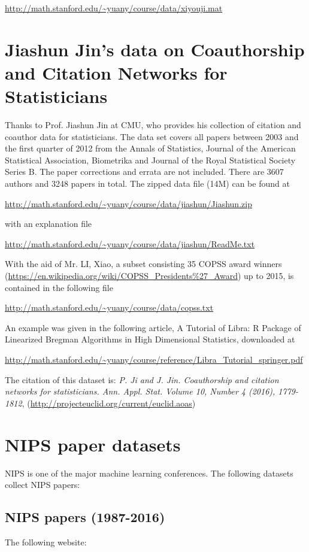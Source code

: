 \documentclass[11pt]{article}
\begin{document}
\url{http://math.stanford.edu/~yuany/course/data/xiyouji.mat}


\section{Jiashun Jin's data on Coauthorship and Citation Networks for Statisticians}
Thanks to Prof. Jiashun Jin at CMU, who provides his collection of citation and coauthor data for statisticians. The data set covers all papers between 2003 and the first quarter of 2012 from the Annals of Statistics, Journal of the American Statistical Association, Biometrika and Journal of the Royal Statistical Society Series B. The paper corrections and errata are not included. There are 3607 authors and 3248 papers in total. The zipped data file (14M) can be found at 

\url{http://math.stanford.edu/~yuany/course/data/jiashun/Jiashun.zip}

\noindent with an explanation file

\url{http://math.stanford.edu/~yuany/course/data/jiashun/ReadMe.txt}

With the aid of Mr. LI, Xiao, a subset consisting 35 COPSS award winners (\url{https://en.wikipedia.org/wiki/COPSS_Presidents\%27_Award}) up to 2015, is contained in the following file

\url{http://math.stanford.edu/~yuany/course/data/copss.txt} 

\noindent An example was given in the following article, A Tutorial of Libra: R Package of Linearized Bregman Algorithms in High Dimensional Statistics, downloaded at

\url{http://math.stanford.edu/~yuany/course/reference/Libra_Tutorial_springer.pdf}

The citation of this dataset is: \emph{P. Ji and J. Jin. Coauthorship and citation networks for statisticians. Ann. Appl. Stat. Volume 10, Number 4 (2016), 1779-1812}, (\url{http://projecteuclid.org/current/euclid.aoas})

\section{NIPS paper datasets}
NIPS is one of the major machine learning conferences. The following datasets collect NIPS papers:

\subsection{NIPS papers (1987-2016)} The following website: 
\end{document}
